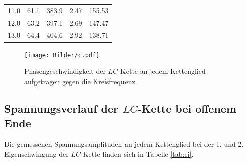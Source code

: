 \begin{table}
\begin{tabular}{ccccc}
		11.0                                        & 61.1                & 383.9                    & 2.47                    & 155.53                                        \\
		12.0                                        & 63.2                & 397.1                    & 2.69                    & 147.47                                        \\
		13.0                                        & 64.4                & 404.6                    & 2.92                    & 138.71                                        \\
		\bottomrule
	\end{tabular}
\end{table}
\begin{figure}
	\centering
	\texttt{[image: Bilder/c.pdf]}
	\caption{Phasengeschwindigkeit der $LC$-Kette an jedem Kettenglied aufgetragen gegen die Kreisfrequenz.}
	\label{fig:plotc}
\end{figure}
\FloatBarrier
\subsection{Spannungsverlauf der $LC$-Kette bei offenem Ende}
Die gemessenen Spannungsamplituden an jedem Kettenglied bei der 1. und 2. Eigenschwingung der $LC$-Kette finden sich in Tabelle \ref{tab:ei}.

